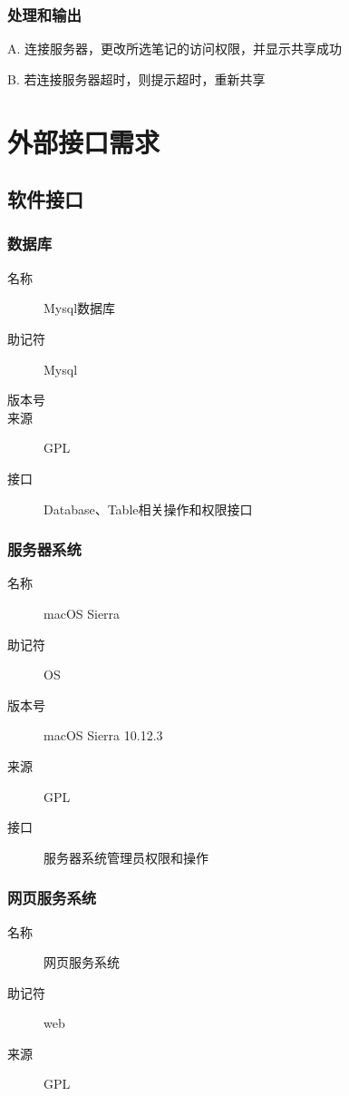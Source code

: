     \subsubsection{处理和输出}
	A. 连接服务器，更改所选笔记的访问权限，并显示共享成功

	B. 若连接服务器超时，则提示超时，重新共享

\section{外部接口需求}
  \subsection{软件接口}

    \subsubsection{数据库}
	\begin{center}\begin{description}
      \item[名称] Mysql数据库
      \item[助记符] Mysql
      \item[版本号]
	\item[来源] GPL
	\item[接口] Database、Table相关操作和权限接口
	\end{description}\end{center}

    \subsubsection{服务器系统}
	\begin{center}\begin{description}
      \item[名称] macOS Sierra
      \item[助记符] OS
      \item[版本号] macOS Sierra 10.12.3
	\item[来源] GPL
	\item[接口] 服务器系统管理员权限和操作
	\end{description}\end{center}

    \subsubsection{网页服务系统}
	\begin{center}\begin{description}
      \item[名称] 网页服务系统
      \item[助记符] web
	\item[来源] GPL
	\end{description}\end{center}

